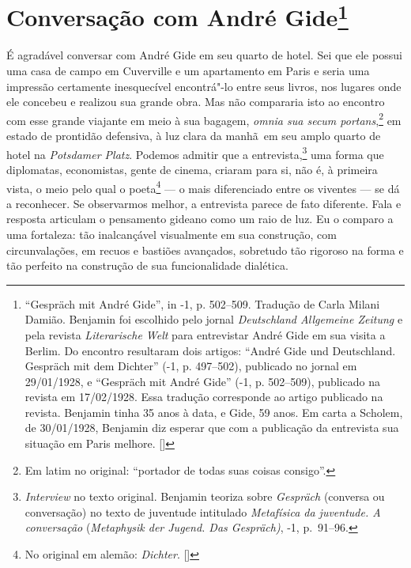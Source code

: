 \chapter{Conversação com André Gide\footnote[*]{``Gespräch mit André Gide'', in -1, p. 502--509. Tradução de Carla Milani Damião. Benjamin
  foi escolhido pelo jornal \emph{Deutschland Allgemeine Zeitung} e pela
  revista \emph{Literarische Welt} para entrevistar André Gide em sua
  visita a Berlim. Do encontro resultaram dois artigos: ``André Gide
  und Deutschland. Gespräch mit dem Dichter'' (-1, p. 497--502),
  publicado no jornal em 29/01/1928, e ``Gespräch mit André Gide''
  (-1, p. 502--509), publicado na revista em 17/02/1928. Essa
  tradução corresponde ao artigo publicado na revista. Benjamin tinha 35
  anos à data, e Gide, 59 anos. Em carta a Scholem, de 30/01/1928,
  Benjamin diz esperar que com a publicação da entrevista sua situação
  em Paris melhore. []}}

É agradável conversar com André Gide em seu quarto de hotel. Sei que ele possui uma casa de campo em Cuverville e um
apartamento em Paris e seria uma impressão certamente inesquecível
encontrá"-lo entre seus livros, nos lugares onde ele concebeu e realizou
sua grande obra. Mas não compararia isto ao encontro com esse grande
viajante em meio à sua bagagem, \emph{omnia sua secum portans},\footnote{Em latim no original: ``portador de todas suas coisas consigo''. \versal{[N.~T.]}} em
estado de prontidão defensiva, à luz clara da manhã~em seu amplo quarto
de hotel na \emph{Potsdamer Platz}. Podemos admitir que a entrevista,\footnote{\emph{Interview} no texto original.
  Benjamin teoriza sobre \emph{Gespräch} (conversa ou conversação) no
  texto de juventude intitulado \emph{Metafísica da juventude. A
  conversação} (\emph{Metaphysik der Jugend. Das Gespräch)},
  -1, p.~91--96. \versal{[N.~T.]}} uma forma que diplomatas, economistas, gente de cinema, criaram
para si, não é, à primeira vista, o meio pelo qual o poeta\footnote{No original em alemão: \emph{Dichter}. []} --- o mais diferenciado entre os viventes --- se dá a
reconhecer. Se observarmos melhor, a entrevista parece de fato
diferente. Fala e resposta articulam o pensamento gideano como um raio
de luz. Eu o comparo a uma fortaleza: tão inalcançável visualmente em
sua construção, com circunvalações, em recuos e bastiões avançados,
sobretudo tão rigoroso na forma e tão perfeito na construção de sua
funcionalidade dialética.

